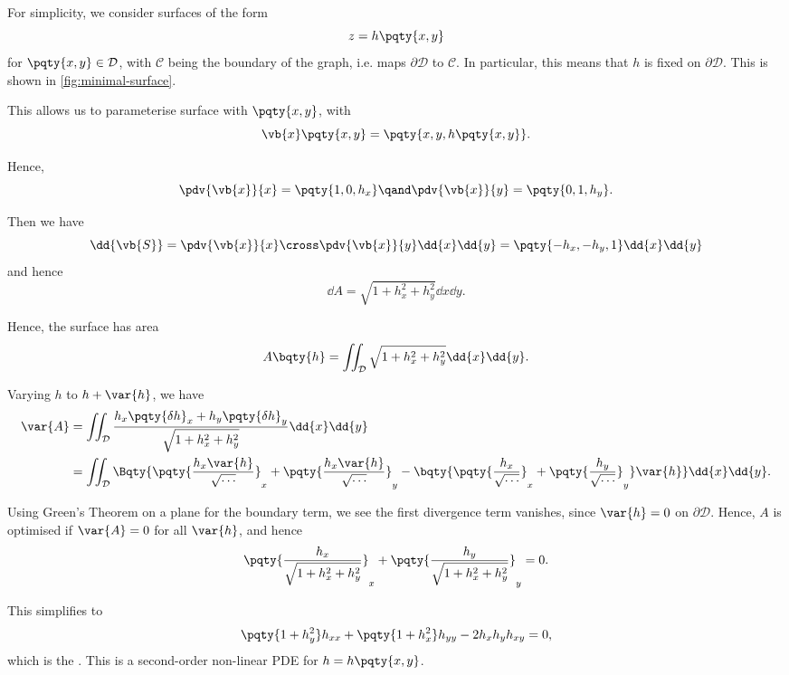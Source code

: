 \begin{example}
    For simplicity, we consider surfaces of the form
    \[
        z = h \pqty{x, y}
    \]
    for \(\pqty{x, y} \in \mathcal{D}\), with \(\mathcal{C}\) being the boundary of the graph, i.e. maps \(\partial \mathcal{D}\) to \(\mathcal{C}\). In particular, this means that \(h\) is fixed on \(\partial \mathcal{D}\). This is shown in \autoref{fig:minimal-surface}.

    This allows us to parameterise surface with \(\pqty{x, y}\), with
    \[
        \vb{x} \pqty{x, y} = \pqty{x, y, h\pqty{x, y}}.
    \]

    Hence,
    \[
        \pdv{\vb{x}}{x} = \pqty{1, 0, h_x} \qand \pdv{\vb{x}}{y} = \pqty{0, 1, h_y}.
    \]

    Then we have
    \[
        \dd{\vb{S}} = \pdv{\vb{x}}{x} \cross \pdv{\vb{x}}{y} \dd{x} \dd{y} = \pqty{-h_x, -h_y, 1} \dd{x} \dd{y}
    \]
    and hence
    \[
        \dd{A} = \sqrt{1 + h_x^2 + h_y^2} \dd{x} \dd{y}.
    \]

    Hence, the surface has area
    \begin{equation}
        \label{eq:area-functional}%
        A \bqty{h} = \iint_{\mathcal{D}} \sqrt{1 + h_x^2 + h_y^2} \dd{x} \dd{y}.
    \end{equation}

    Varying \(h\) to \(h + \var{h}\), we have
    \begin{align*}
        \var{A} &= \iint_{\mathcal{D}} \frac{h_x \pqty{\delta h}_x + h_y \pqty{\delta h}_y}{\sqrt{1 + h_x^2 + h_y^2}} \dd{x} \dd{y} \\
        &= \iint_{\mathcal{D}} \Bqty{\pqty{\frac{h_x \var{h}}{\sqrt{\cdots}}}_x + \pqty{\frac{h_x \var{h}}{\sqrt{\cdots}}}_y - \bqty{\pqty{\frac{h_x}{\sqrt{\cdots}}}_x + \pqty{\frac{h_y}{\sqrt{\cdots}}}_y} \var{h}} \dd{x} \dd{y}.
    \end{align*}
    
    Using Green's Theorem on a plane for the boundary term, we see the first divergence term vanishes, since \(\var{h} = 0\) on \(\partial \mathcal{D}\). Hence, \(A\) is optimised if \(\var{A} = 0\) for all \(\var{h}\), and hence
    \[
        \pqty{\frac{h_x}{\sqrt{1 + h_x^2 + h_y^2}}}_x + \pqty{\frac{h_y}{\sqrt{1 + h_x^2 + h_y^2}}}_y = 0.
    \]

    This simplifies to
    \[
        \pqty{1 + h_y^2} h_{xx} + \pqty{1 + h_x^2} h_{yy} - 2 h_x h_y h_{xy} = 0,
    \]
    which is the . This is a second-order non-linear PDE for \(h = h\pqty{x, y}\).
\end{example}

